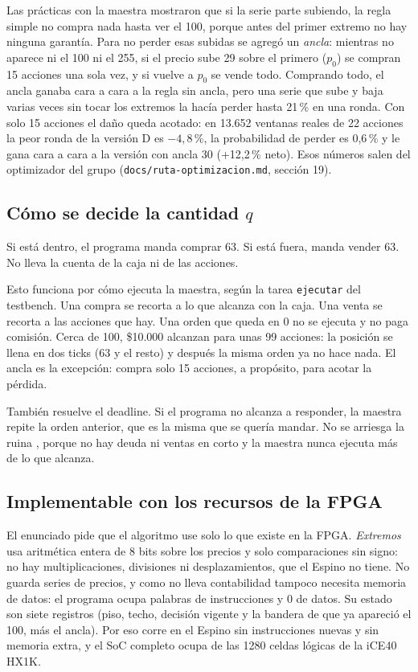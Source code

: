 \documentclass[11pt,letterpaper]{article}
\begin{document}
Las prácticas con la maestra mostraron que si la serie parte subiendo, la regla simple no compra nada
hasta ver el 100, porque antes del primer extremo no hay ninguna garantía. Para no perder esas subidas
se agregó un \emph{ancla}: mientras no aparece ni el 100 ni el 255, si el precio sube 29 sobre el primero
($p_0$) se compran 15 acciones una sola vez, y si vuelve a $p_0$ se vende todo. Comprando todo, el ancla
ganaba cara a cara a la regla sin ancla, pero una serie que sube y baja varias veces sin tocar los
extremos la hacía perder hasta 21\,\% en una ronda. Con solo 15 acciones el daño queda acotado: en
13.652 ventanas reales de 22 acciones la peor ronda de la versión D es $-4{,}8$\,\%, la probabilidad de
perder es 0,6\,\% y le gana cara a cara a la versión con ancla 30 (+12,2\,\% neto). Esos números salen
del optimizador del grupo (\texttt{docs/ruta-optimizacion.md}, sección 19).

\subsection{Cómo se decide la cantidad $q$}

Si está dentro, el programa manda comprar 63. Si está fuera, manda vender 63. No lleva la cuenta de
la caja ni de las acciones.

Esto funciona por cómo ejecuta la maestra, según la tarea \texttt{ejecutar} del testbench. Una
compra se recorta a lo que alcanza con la caja. Una venta se recorta a las acciones que hay. Una
orden que queda en 0 no se ejecuta y no paga comisión. Cerca de 100, \$10.000 alcanzan para unas 99
acciones: la posición se llena en dos ticks (63 y el resto) y después la misma orden ya no hace nada.
El ancla es la excepción: compra solo 15 acciones, a propósito, para acotar la pérdida.

También resuelve el deadline. Si el programa no alcanza a responder, la maestra repite la orden
anterior, que es la misma que se quería mandar. No se arriesga la ruina \cite{naval}, porque no hay
deuda ni ventas en corto y la maestra nunca ejecuta más de lo que alcanza.

\subsection{Implementable con los recursos de la FPGA}

El enunciado pide que el algoritmo use solo lo que existe en la FPGA. \emph{Extremos} usa aritmética
entera de 8 bits sobre los precios y solo comparaciones sin signo: no hay multiplicaciones, divisiones
ni desplazamientos, que el Espino no tiene. No guarda series de precios, y como no lleva contabilidad
tampoco necesita memoria de datos: el programa ocupa \ExtPalabras{} palabras de instrucciones y 0 de
datos. Su estado son siete registros (piso, techo, decisión vigente y la bandera de que ya apareció el
100, más el ancla). Por eso corre en el Espino sin instrucciones nuevas y sin memoria extra, y el SoC
completo ocupa \LCSw{} de las 1280 celdas lógicas de la iCE40 HX1K.
\end{document}
